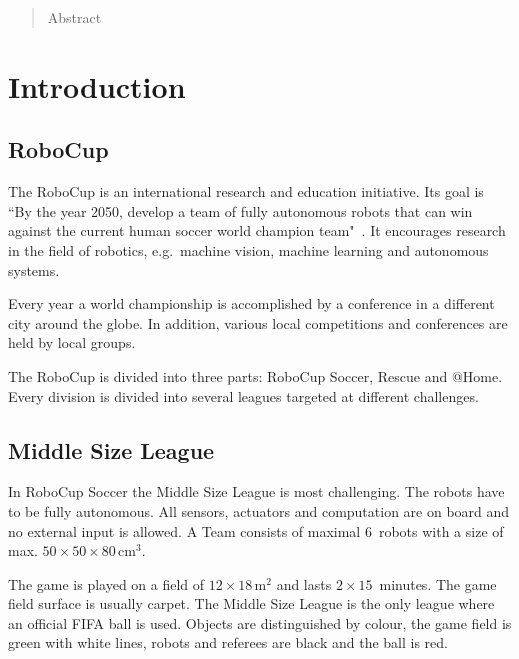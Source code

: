 \documentclass[12pt,a4paper]{article}
\newcommand{\MSL}{Middle Size League\xspace}
\begin{document}


\tableofcontents
\clearpage
\pagestyle{plain}


\begin{abstract}
Abstract

\end{abstract}

\clearpage

\section{Introduction}


\subsection{RoboCup}

The RoboCup is an international research and education initiative. 
Its goal is ``By the year 2050, develop a team of fully autonomous robots that can win against the current human soccer world champion team"~\cite{robocup.org}.
It encourages research in the field of robotics, e.g.\ machine vision, machine learning and autonomous systems.


Every year a world championship is accomplished by a conference in a different city around the globe.
In addition, various local competitions and conferences are held by local groups.

The RoboCup is divided into three parts: RoboCup Soccer, Rescue and @Home.
Every division is divided into several leagues targeted at different challenges.


\subsection{\MSL}

In RoboCup Soccer the \MSL is most challenging.
The robots have to be fully autonomous.
All sensors, actuators and computation are on board and no external input is allowed.
A Team consists of maximal 6~robots with a size of max. $50\times50\times80$\,cm$^3$.

The game is played on a field of $12\times18$\,m$^2$ and lasts $2\times15$~minutes.
The game field surface is usually carpet.
The \MSL is the only league where an official FIFA ball is used.
Objects are distinguished by colour, the game field is green with white lines, robots and referees are black and the ball is red.
\end{document}
